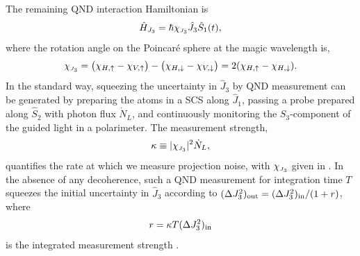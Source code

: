 \documentclass[preprint, aps,pra,onecolumn]{revtex4-1} %
\newcommand{\inp}{{\rm in}}
\newcommand{\jx}{\hat{J}_1}
\newcommand{\jz}{\hat{J}_3}
\newcommand{\chieff}{\chi_{\raisebox{-.1pt}{\tiny $J_3$}}}
\begin{document}
The remaining QND interaction Hamiltonian is
	\begin{equation} \label{Eq::FaradayHam}
		\hat{H}_{J_3} = \hbar \chieff \jz \hat{S}_1(t),
	\end{equation}
where the rotation angle on the Poincar\'{e} sphere at the magic wavelength is,
\begin{equation}\label{eq:chiJ3}
\chieff = \big( \chi_{H, \uparrow} - \chi_{V,\uparrow} \big) - \big(\chi_{H,\downarrow} - \chi_{V,\downarrow} \big) = 2(\chi_{H, \uparrow}-\chi_{H, \downarrow}).
\end{equation}
In the standard way, squeezing the uncertainty in $\jz$ by QND measurement can be generated by preparing the atoms in a SCS along $\jx$, passing a probe prepared along $\hat{S}_2$ with photon flux $\dot{N}_L$, and continuously monitoring the $S_3$-component of the guided light in a polarimeter. The measurement strength,
	\begin{align} \label{Eq::MeasurementStrength}
		\kappa \equiv |\chieff|^2 \dot{N}_L, 
	\end{align}
quantifies the rate at which we measure projection noise, with $\chieff$ given in . 
In the absence of any decoherence, such a QND measurement for integration time $T$ squeezes the initial uncertainty in $\jz$ according to $(\Delta J_3^2)_{\rm out}= (\Delta J_3^2)_{\rm in}/(1+r)$, where
	\begin{equation}
		r = \kappa T  (\Delta J_3^2)_{\inp}
	\end{equation}
is the integrated measurement strength \cite{hammerer_quantum_2010, baragiola_three-dimensional_2014}.
\end{document}

